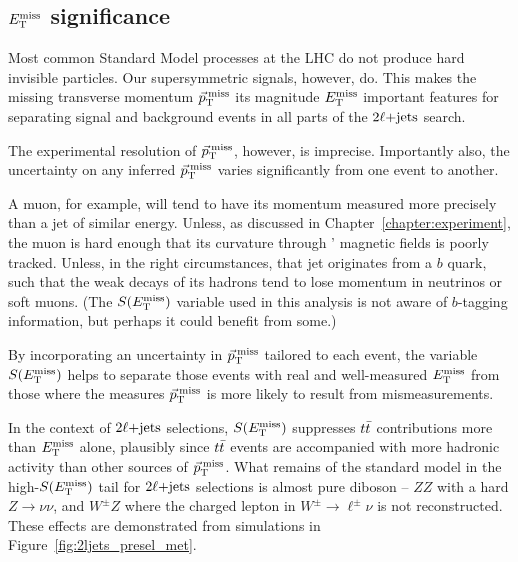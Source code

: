 \subsection{$E_\mathrm{T}^\mathrm{miss}$ significance}
\label{sec:2ljets_metsig}
Most common Standard Model processes at the LHC do not produce hard
invisible particles.
Our supersymmetric signals, however, do.
This makes the missing transverse momentum $\vec p_\mathrm{T}^\mathrm{\:miss}$ its magnitude $E_\mathrm{T}^\mathrm{miss}$
important features for separating signal and background events in all parts
of the $2\ell\mathrm{+jets}$ search.

The experimental resolution of $\vec p_\mathrm{T}^\mathrm{\:miss}$, however, is imprecise.
Importantly also, the uncertainty on any inferred $\vec p_\mathrm{T}^\mathrm{\:miss}$ varies
significantly from one event to another.

A muon, for example, will tend to have its momentum measured more precisely
than a jet of similar energy.
Unless, as discussed in Chapter~\ref{chapter:experiment}, the muon is hard
enough that its curvature through \atlas' magnetic fields is poorly tracked.
Unless, in the right circumstances, that jet originates from a $b$ quark,
such that the weak decays of its hadrons tend to lose momentum in
neutrinos or soft muons. (The $S(E_\mathrm{T}^\mathrm{miss})$ variable used in this analysis is not
aware of $b$-tagging information, but perhaps it could benefit from some.)

By incorporating an uncertainty in $\vec p_\mathrm{T}^\mathrm{\:miss}$ tailored to each event, the
variable $S(E_\mathrm{T}^\mathrm{miss})$ helps to separate those events with real and well-measured
$E_\mathrm{T}^\mathrm{miss}$ from those where the measures $\vec p_\mathrm{T}^\mathrm{\:miss}$ is more likely to result from
mismeasurements.

In the context of $2\ell\mathrm{+jets}$ selections, $S(E_\mathrm{T}^\mathrm{miss})$ suppresses $t\bar t$
contributions more than $E_\mathrm{T}^\mathrm{miss}$ alone, plausibly since $t\bar t$ events are
accompanied with more hadronic activity than other sources of $\vec p_\mathrm{T}^\mathrm{\:miss}$.
What remains of the standard model in the high-$S(E_\mathrm{T}^\mathrm{miss})$ tail for $2\ell\mathrm{+jets}$
selections is almost pure diboson -- $ZZ$ with a hard $Z\rightarrow \nu\nu$,
and $W^\pm Z$ where the charged lepton in $W^\pm\rightarrow\ell^\pm\nu$
is not reconstructed.
These effects are demonstrated from simulations in
Figure~\ref{fig:2ljets_presel_met}.

